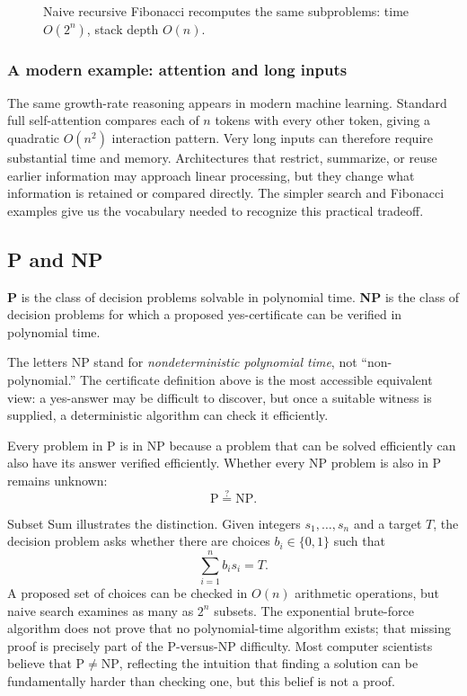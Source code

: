 \documentclass[11pt]{article}
\begin{document}
\begin{figure}[htbp]
  \centering
  
  \caption{Naive recursive Fibonacci recomputes the same subproblems: time $O(2^n)$, stack depth $O(n)$.}
\end{figure}

\subsubsection*{A modern example: attention and long inputs}

The same growth-rate reasoning appears in modern machine learning. Standard
full self-attention compares each of $n$ tokens with every other token, giving
a quadratic $O(n^2)$ interaction pattern. Very long inputs can therefore
require substantial time and memory. Architectures that restrict, summarize,
or reuse earlier information may approach linear processing, but they change
what information is retained or compared directly. The simpler search and
Fibonacci examples give us the vocabulary needed to recognize this practical
tradeoff.

\subsection{P and NP}

\begin{definition}[P and NP]
\textbf{P} is the class of decision problems solvable in polynomial time. \textbf{NP} is the class of decision problems for which a proposed yes-certificate can be verified in polynomial time.
\end{definition}

The letters NP stand for \emph{nondeterministic polynomial time}, not
``non-polynomial.'' The certificate definition above is the most accessible
equivalent view: a yes-answer may be difficult to discover, but once a suitable
witness is supplied, a deterministic algorithm can check it efficiently.

Every problem in P is in NP because a problem that can be solved efficiently
can also have its answer verified efficiently. Whether every NP problem is also
in P remains unknown:
\[
  \mathrm{P}\stackrel{?}{=}\mathrm{NP}.
\]

Subset Sum illustrates the distinction. Given integers
$s_1,\ldots,s_n$ and a target $T$, the decision problem asks whether there are
choices $b_i\in\{0,1\}$ such that
\[
  \sum_{i=1}^{n} b_i s_i=T.
\]
A proposed set of choices can be checked in $O(n)$ arithmetic operations, but
naive search examines as many as $2^n$ subsets. The exponential brute-force
algorithm does not prove that no polynomial-time algorithm exists; that missing
proof is precisely part of the P-versus-NP difficulty. Most computer scientists
believe that $\mathrm{P}\ne\mathrm{NP}$, reflecting the intuition that finding a
solution can be fundamentally harder than checking one, but this belief is not
a proof.
\end{document}
